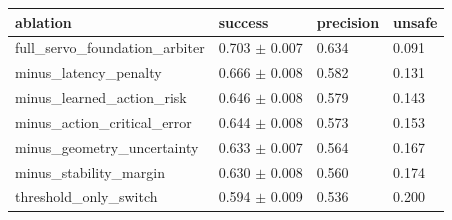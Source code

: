 \begin{tabular}{llll}
\toprule
ablation & success & precision & unsafe \\
\midrule
full\_servo\_foundation\_arbiter & 0.703 $\pm$ 0.007 & 0.634 & 0.091 \\
minus\_latency\_penalty & 0.666 $\pm$ 0.008 & 0.582 & 0.131 \\
minus\_learned\_action\_risk & 0.646 $\pm$ 0.008 & 0.579 & 0.143 \\
minus\_action\_critical\_error & 0.644 $\pm$ 0.008 & 0.573 & 0.153 \\
minus\_geometry\_uncertainty & 0.633 $\pm$ 0.007 & 0.564 & 0.167 \\
minus\_stability\_margin & 0.630 $\pm$ 0.008 & 0.560 & 0.174 \\
threshold\_only\_switch & 0.594 $\pm$ 0.009 & 0.536 & 0.200 \\
\bottomrule
\end{tabular}
